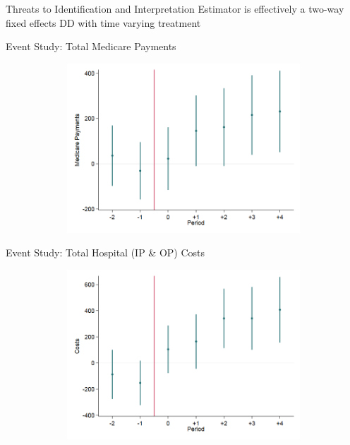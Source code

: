 \documentclass[t,aspectratio=169]{beamer}
\begin{document}
\begin{frame}{Threats to Identification and Interpretation}
    Estimator is effectively a two-way fixed effects DD with time varying treatment
\end{frame}

\begin{frame}{Event Study: Total Medicare Payments}
    \begin{figure}
        \centering
        \includegraphics[height=2.5in,width=5in,keepaspectratio]{EventPay_All_2011}
    \end{figure}
\end{frame}

\begin{frame}{Event Study: Total Hospital (IP \& OP) Costs}
    \begin{figure}
        \centering
        \includegraphics[height=2.5in,width=5in,keepaspectratio]{EventCharge_All_2011}
    \end{figure}
\end{frame}
\end{document}
